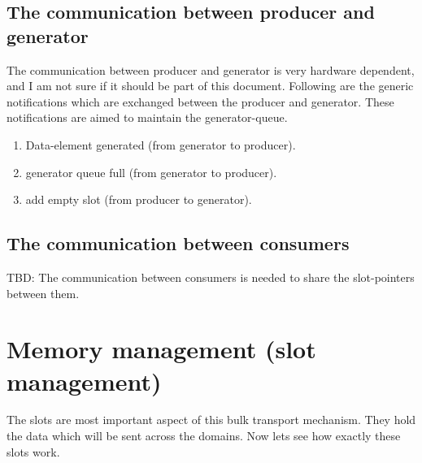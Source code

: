 \documentclass[a4paper,twoside]{report} %
\begin{document}
\subsection{The communication between producer and generator}
The communication between producer and generator is very
hardware dependent, and I am not sure if it should be part of this
document.  Following are the generic notifications which are exchanged
between the producer and generator.  These notifications are aimed to
maintain the generator-queue.

\begin{enumerate} 
  \item Data-element generated (from generator to producer).
  \item generator queue full (from generator to producer).
  \item add empty slot (from producer to generator). 
\end{enumerate} 

\subsection{The communication between consumers}
TBD:  The communication between consumers is needed to share the
slot-pointers between them.


\section{Memory management (slot management)}
The slots are most important aspect of this bulk transport mechanism.
They hold the data which will be sent across the domains.  Now lets
see how exactly these slots work.
\end{document}
